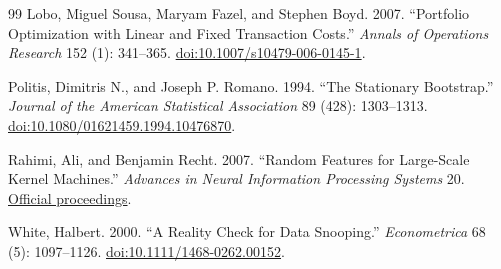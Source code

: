 \documentclass[12pt,letterpaper,fleqn]{article}
\begin{document}
\begin{thebibliography}{99}
Lobo, Miguel Sousa, Maryam Fazel, and Stephen Boyd. 2007.
``Portfolio Optimization with Linear and Fixed Transaction Costs.''
\textit{Annals of Operations Research} 152 (1): 341--365.
\href{https://doi.org/10.1007/s10479-006-0145-1}{doi:10.1007/s10479-006-0145-1}.

Politis, Dimitris N., and Joseph P. Romano. 1994.
``The Stationary Bootstrap.''
\textit{Journal of the American Statistical Association} 89 (428): 1303--1313.
\href{https://doi.org/10.1080/01621459.1994.10476870}{doi:10.1080/01621459.1994.10476870}.

Rahimi, Ali, and Benjamin Recht. 2007.
``Random Features for Large-Scale Kernel Machines.''
\textit{Advances in Neural Information Processing Systems} 20.
\href{https://papers.nips.cc/paper_files/paper/2007/hash/013a006f03dbc5392effeb8f18fda755-Abstract.html}{Official proceedings}.

White, Halbert. 2000.
``A Reality Check for Data Snooping.''
\textit{Econometrica} 68 (5): 1097--1126.
\href{https://doi.org/10.1111/1468-0262.00152}{doi:10.1111/1468-0262.00152}.
\end{thebibliography}
\end{document}
